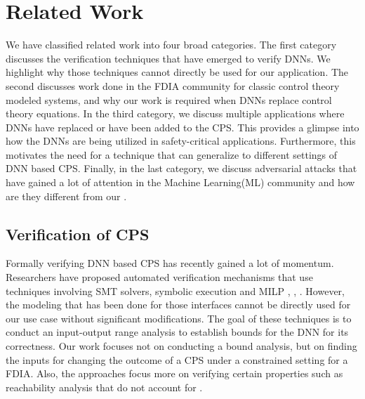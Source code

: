 \chapter{Related Work}
\label{relatedwork}

We have classified related work into four broad categories. 
The first category discusses the verification techniques that have emerged to verify DNNs. We highlight why those techniques cannot directly be used for our application. The second discusses work done in the \ac{FDIA} community for classic control theory modeled systems, and why our work is required when \ac{DNN}s replace control theory equations. 
In the third category, we discuss multiple applications where DNNs have replaced or have been added to the CPS. This provides a glimpse into how the DNNs are being utilized in safety-critical applications. Furthermore, this motivates the need for a technique that can generalize to different settings of DNN based CPS.
 Finally, in the last category, we discuss adversarial attacks that have gained a lot of attention in the Machine Learning(ML) community and how are they different from our \attack. 
\section{Verification of CPS}

Formally verifying DNN based CPS has recently gained a lot of momentum. Researchers have proposed automated verification mechanisms that use techniques involving SMT solvers, symbolic execution and MILP \cite{10.1007/978-3-642-14295-6_24}, \cite{article}, \cite{10.1007/978-3-319-63387-9_5}. 
However, the modeling that has been done for those interfaces cannot be directly used for our use case without significant modifications. 
The goal of these techniques is to conduct an input-output range analysis to establish bounds for the DNN for its correctness. Our work focuses not on conducting a bound analysis, but on finding the inputs for changing the outcome of a CPS under a constrained setting for a FDIA. Also, the approaches focus more on verifying certain properties such as reachability analysis that do not account for \attack.

